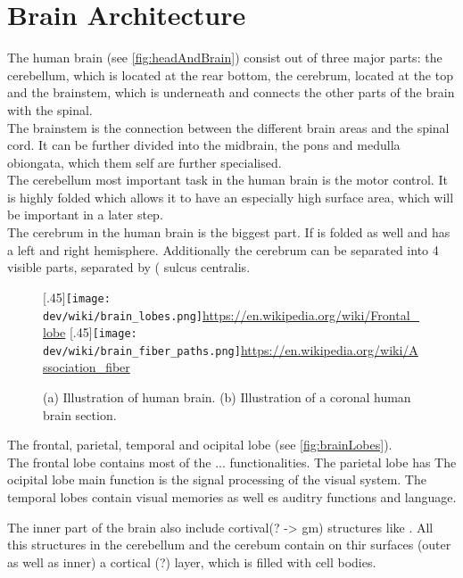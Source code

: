 \section{Brain Architecture}
% 
The human brain (see \cref{fig:headAndBrain}) consist out of three major parts: the cerebellum, which is located at the rear bottom, the cerebrum, located at the top and the brainstem, which is underneath and connects the other parts of the brain with the spinal.
\\
The brainstem is the connection between the different brain areas and the spinal cord.
It can be further divided into the midbrain, the pons and medulla obiongata, which them self are further specialised.
\\
The cerebellum most important task in the human brain is the motor control.
It is highly folded which allows it to have an especially high surface area, which will be important in a later step.
\\
The cerebrum in the human brain is the biggest part.
If is folded as well and has a left and right hemisphere.
Additionally the cerebrum can be separated into 4 visible parts, separated by \dummy{} (\eg{} sulcus centralis.
% 
\begin{figure}[!t]
\centering
\hspace*{\fill}
\subcaptionbox{\label{fig:brainLobes}}[.45\textwidth]{\texttt{[image: dev/wiki/brain\_lobes.png]}\url{https://en.wikipedia.org/wiki/Frontal_lobe}}
\hspace*{\fill}
\subcaptionbox{\label{fig:nerveFiber}}[.45\textwidth]{\texttt{[image: dev/wiki/brain\_fiber\_paths.png]}\url{https://en.wikipedia.org/wiki/Association_fiber}}
\hspace*{\fill}
\caption{(a) Illustration of human brain. (b) Illustration of a coronal human brain section. }
\label{fig:human-fiber}
\end{figure}
% 
The frontal, parietal, temporal  and ocipital lobe (see \cref{fig:brainLobes}).
\\
The frontal lobe contains most of the ... functionalities.
The parietal lobe has \dummy{}
The ocipital lobe main function is the signal processing of the visual system.
The temporal lobes contain visual memories as well es auditry functions and language.
\par
The inner part of the brain also include cortival(? -> gm) structures like \dummy{}.
All this structures in the cerebellum and the cerebum contain on thir surfaces (outer as well as inner) a cortical (?) layer, which is filled with cell bodies.
